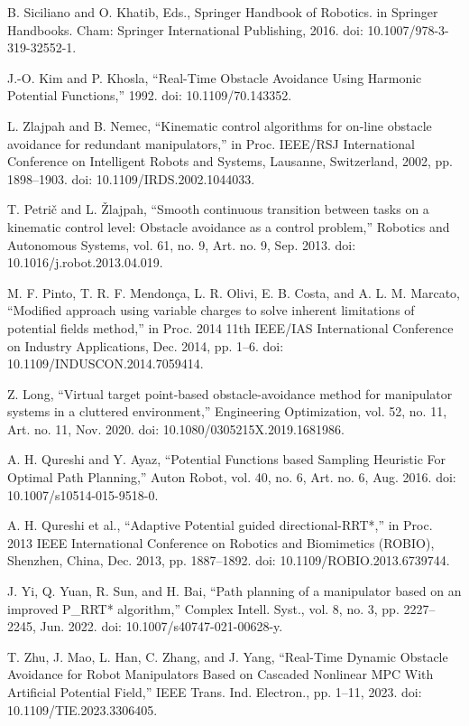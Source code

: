 \documentclass[letterpaper, 10 pt, conference]{ieeeconf}  %
\begin{document}
\begin{thebibliography}{99}
 B. Siciliano and O. Khatib, Eds., Springer Handbook of Robotics. in Springer Handbooks. Cham: Springer International Publishing, 2016. doi: 10.1007/978-3-319-32552-1.

 J.-O. Kim and P. Khosla, “Real-Time Obstacle Avoidance Using Harmonic Potential Functions,” 1992. doi: 10.1109/70.143352.

 L. Zlajpah and B. Nemec, “Kinematic control algorithms for on-line obstacle avoidance for redundant manipulators,” in Proc. IEEE/RSJ International Conference on Intelligent Robots and Systems, Lausanne, Switzerland, 2002, pp. 1898–1903. doi: 10.1109/IRDS.2002.1044033.

 T. Petrič and L. Žlajpah, “Smooth continuous transition between tasks on a kinematic control level: Obstacle avoidance as a control problem,” Robotics and Autonomous Systems, vol. 61, no. 9, Art. no. 9, Sep. 2013. doi: 10.1016/j.robot.2013.04.019.

 M. F. Pinto, T. R. F. Mendonça, L. R. Olivi, E. B. Costa, and A. L. M. Marcato, “Modified approach using variable charges to solve inherent limitations of potential fields method,” in Proc. 2014 11th IEEE/IAS International Conference on Industry Applications, Dec. 2014, pp. 1–6. doi: 10.1109/INDUSCON.2014.7059414.

 Z. Long, “Virtual target point-based obstacle-avoidance method for manipulator systems in a cluttered environment,” Engineering Optimization, vol. 52, no. 11, Art. no. 11, Nov. 2020. doi: 10.1080/0305215X.2019.1681986.

 A. H. Qureshi and Y. Ayaz, “Potential Functions based Sampling Heuristic For Optimal Path Planning,” Auton Robot, vol. 40, no. 6, Art. no. 6, Aug. 2016. doi: 10.1007/s10514-015-9518-0.

 A. H. Qureshi et al., “Adaptive Potential guided directional-RRT*,” in Proc. 2013 IEEE International Conference on Robotics and Biomimetics (ROBIO), Shenzhen, China, Dec. 2013, pp. 1887–1892. doi: 10.1109/ROBIO.2013.6739744.

 J. Yi, Q. Yuan, R. Sun, and H. Bai, “Path planning of a manipulator based on an improved P\_RRT* algorithm,” Complex Intell. Syst., vol. 8, no. 3, pp. 2227–2245, Jun. 2022. doi: 10.1007/s40747-021-00628-y.

 T. Zhu, J. Mao, L. Han, C. Zhang, and J. Yang, “Real-Time Dynamic Obstacle Avoidance for Robot Manipulators Based on Cascaded Nonlinear MPC With Artificial Potential Field,” IEEE Trans. Ind. Electron., pp. 1–11, 2023. doi: 10.1109/TIE.2023.3306405.


\end{thebibliography}
\end{document}
